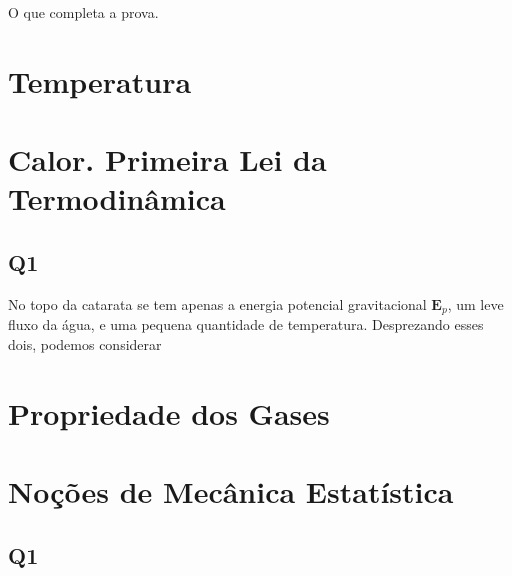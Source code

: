 \documentclass{antiquebook}
\begin{document}
	O que completa a prova.
	
	\chapter{Temperatura}

	\chapter{Calor. Primeira Lei da Termodinâmica}

	\section{Q1}

	No topo da catarata se tem apenas a energia potencial gravitacional
	$\mathbf{E}_p$, um leve fluxo da água, e uma pequena quantidade
	de temperatura. Desprezando esses dois, podemos considerar


	\chapter{Propriedade dos Gases}

	\chapter{Noções de Mecânica Estatística}

	\section{Q1}
	
\end{document}
